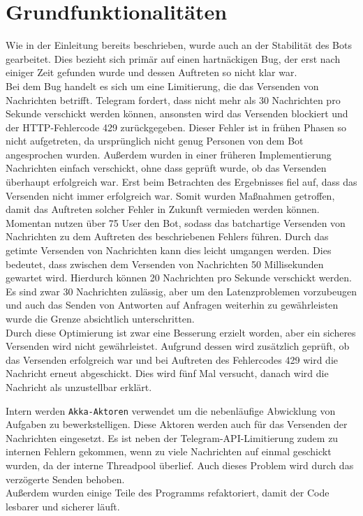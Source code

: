 \section{Grundfunktionalitäten}
Wie in der Einleitung bereits beschrieben, wurde auch an der Stabilität des Bots gearbeitet. Dies bezieht sich primär auf einen hartnäckigen Bug, der erst nach einiger Zeit gefunden wurde und dessen Auftreten so nicht klar war. \\
Bei dem Bug handelt es sich um eine Limitierung, die das Versenden von Nachrichten betrifft. Telegram fordert, dass nicht mehr als 30 Nachrichten pro Sekunde verschickt werden können, ansonsten wird das Versenden blockiert und  der HTTP-Fehlercode 429 zurückgegeben. Dieser Fehler ist in frühen Phasen so nicht aufgetreten, da ursprünglich nicht genug Personen von dem Bot angesprochen wurden. Außerdem wurden in einer früheren Implementierung Nachrichten einfach verschickt, ohne dass geprüft wurde, ob das Versenden überhaupt erfolgreich war. Erst beim Betrachten des Ergebnisses fiel auf, dass das Versenden nicht immer erfolgreich war. Somit wurden Maßnahmen getroffen, damit das Auftreten solcher Fehler in Zukunft vermieden werden können. \\
Momentan nutzen über 75 User den Bot, sodass das batchartige Versenden von Nachrichten zu dem Auftreten des beschriebenen Fehlers führen. Durch das getimte Versenden von Nachrichten kann dies leicht umgangen werden. Dies bedeutet, dass zwischen dem Versenden von Nachrichten 50 Millisekunden gewartet wird. Hierdurch können 20 Nachrichten pro Sekunde verschickt werden. Es sind zwar 30 Nachrichten zulässig, aber um den Latenzproblemen vorzubeugen und auch das Senden von Antworten auf Anfragen weiterhin zu gewährleisten wurde die Grenze absichtlich unterschritten. \\
Durch diese Optimierung ist zwar eine Besserung erzielt worden, aber ein sicheres Versenden wird nicht gewährleistet. Aufgrund dessen wird zusätzlich geprüft, ob das Versenden erfolgreich war und bei Auftreten des Fehlercodes 429 wird die Nachricht erneut abgeschickt. Dies wird fünf Mal versucht, danach wird die Nachricht als unzustellbar erklärt.

Intern werden \texttt{Akka-Aktoren} verwendet um die nebenläufige Abwicklung von Aufgaben zu bewerkstelligen. Diese Aktoren werden auch für das Versenden der Nachrichten eingesetzt. Es ist neben der Telegram-API-Limitierung zudem zu internen Fehlern gekommen, wenn zu viele Nachrichten auf einmal geschickt wurden, da der interne Threadpool überlief. Auch dieses Problem wird durch das verzögerte Senden behoben. \\
Außerdem wurden einige Teile des Programms refaktoriert, damit der Code lesbarer und sicherer läuft.

